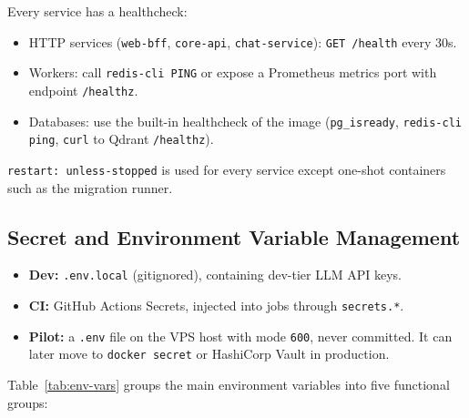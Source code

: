 Every service has a healthcheck:

\begin{itemize}
    \item HTTP services (\texttt{web-bff}, \texttt{core-api},
          \texttt{chat-service}): \texttt{GET /health} every 30s.
    \item Workers: call \texttt{redis-cli PING} or expose a Prometheus
          metrics port with endpoint \texttt{/healthz}.
    \item Databases: use the built-in healthcheck of the image
          (\texttt{pg\_isready}, \texttt{redis-cli ping},
          \texttt{curl} to Qdrant \texttt{/healthz}).
\end{itemize}

\texttt{restart: unless-stopped} is used for every service except
one-shot containers such as the migration runner.

\subsection{Secret and Environment Variable Management}
\label{appendix:secrets}

\begin{itemize}
    \item \textbf{Dev:} \texttt{.env.local} (gitignored), containing
          dev-tier LLM API keys.
    \item \textbf{CI:} GitHub Actions Secrets, injected into jobs
          through \texttt{secrets.*}.
    \item \textbf{Pilot:} a \texttt{.env} file on the VPS host with mode
          \texttt{600}, never committed. It can later move to
          \texttt{docker secret} or HashiCorp Vault in production.
\end{itemize}

Table~\ref{tab:env-vars} groups the main environment variables into
five functional groups:

